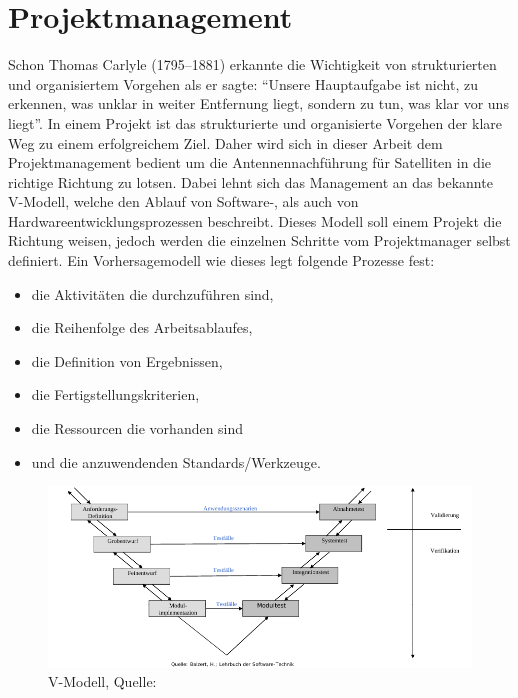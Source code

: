 
\chapter{Projektmanagement}
Schon Thomas Carlyle (1795–1881) erkannte die Wichtigkeit von strukturierten und organisiertem Vorgehen als er sagte:\newpar
``Unsere Hauptaufgabe ist nicht, zu erkennen, was unklar in weiter Entfernung liegt, sondern zu tun, was klar vor uns liegt''.\newpar
In einem Projekt ist das strukturierte und organisierte Vorgehen der klare Weg zu einem 
erfolgreichem Ziel. Daher wird sich in dieser Arbeit
dem Projektmanagement bedient um die Antennennachführung für Satelliten in die richtige Richtung zu 
lotsen. Dabei lehnt sich das Management an 
das bekannte V-Modell, welche den Ablauf von Software-, als auch von Hardwareentwicklungsprozessen 
beschreibt. Dieses Modell soll einem Projekt 
die Richtung weisen, jedoch werden die einzelnen Schritte vom Projektmanager selbst definiert. Ein 
Vorhersagemodell wie dieses legt folgende
Prozesse fest:
\begin{itemize}
 \item die Aktivitäten die durchzuführen sind,
 \item die Reihenfolge des Arbeitsablaufes,
 \item die Definition von Ergebnissen,
 \item die Fertigstellungskriterien,
 \item die Ressourcen die vorhanden sind
 \item und die anzuwendenden Standards/Werkzeuge.
\end{itemize}
\begin{figure}[h]
 \centering
 \includegraphics[width=0.8\linewidth]{./images/vmodell}
 \caption{V-Modell, Quelle: \cite{swscript}} %
 \label{fig:vmodell}
\end{figure}
